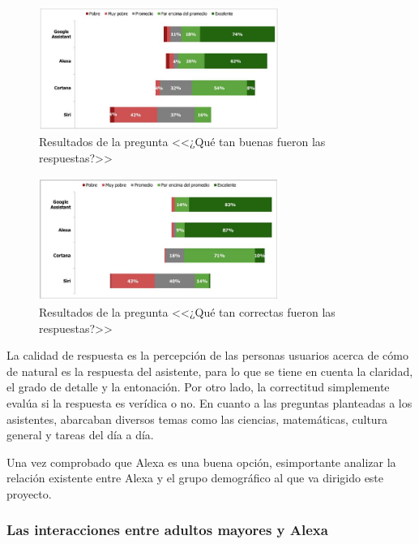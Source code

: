 \begin{figure}[H]
	\centering
	\includegraphics[width=0.7\textwidth]{imgs/alexa-compare-1.JPG}
	\caption{Resultados de la pregunta <<¿Qué tan buenas fueron las respuestas?>>}
	\label{fig:grafico-alexa-1}
\end{figure}

\begin{figure}[H]
	\centering
	\includegraphics[width=0.7\textwidth]{imgs/alexa-compare-2.JPG}
	\caption{Resultados de la pregunta <<¿Qué tan correctas fueron las respuestas?>>}
	\label{fig:grafico-alexa-2}
\end{figure}

La calidad de respuesta es la percepción de las personas usuarios acerca de cómo de natural es la respuesta del asistente, para lo que se tiene en cuenta la claridad, el grado de detalle y la entonación. Por otro lado, la correctitud simplemente evalúa si la respuesta es verídica o no. En cuanto a las preguntas planteadas a los asistentes, abarcaban diversos temas como las ciencias, matemáticas, cultura general y tareas del día a día.

Una vez comprobado que Alexa es una buena opción, esimportante analizar la relación existente entre Alexa y el grupo demográfico al que va dirigido este proyecto.

\subsubsection{Las interacciones entre adultos mayores y Alexa}

